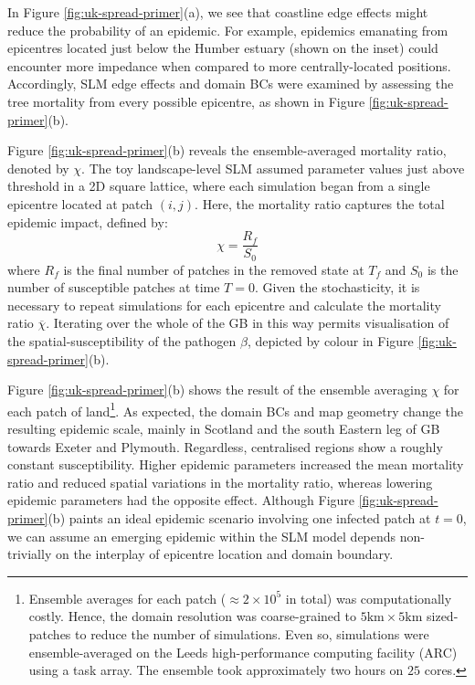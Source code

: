 In Figure \ref{fig:uk-spread-primer}(a), we see that coastline edge effects
might reduce the probability of an epidemic.
For example, epidemics emanating from epicentres located just below the 
Humber estuary (shown on the inset) could encounter more impedance when 
compared to more centrally-located positions.
Accordingly, SLM edge effects and domain BCs were examined by assessing the 
tree mortality from every possible epicentre, as shown in Figure \ref{fig:uk-spread-primer}(b).

Figure \ref{fig:uk-spread-primer}(b) reveals the ensemble-averaged mortality 
ratio, denoted by $\chi$.
The toy landscape-level SLM assumed parameter values just above threshold in a 2D square lattice,
where each simulation began from a single epicentre located at patch $(i, j)$.
Here, the mortality ratio captures the total epidemic impact, defined by: 
\begin{equation}
\label{eq:epi_impact}
    \chi=\frac{R_f}{S_0}
\end{equation}
where $R_f$ is the final number of patches in the removed state at $T_f$ and $S_0$ is the number of susceptible 
patches at time $T=0$. Given the stochasticity, it is necessary to repeat simulations for each epicentre 
and calculate the mortality ratio $\overline{\chi}$. Iterating over the whole of the GB in this way permits visualisation of the spatial-susceptibility of the pathogen $\beta$, depicted by colour in Figure \ref{fig:uk-spread-primer}(b).

Figure \ref{fig:uk-spread-primer}(b) shows the result of the ensemble averaging $\chi$ for each
patch of land\footnote{Ensemble averages for each patch ($\approx 2 \times 10^5$ in total) was computationally costly. 
Hence, the domain resolution was coarse-grained to $\mathrm{5km \times 5km}$ sized-patches to reduce the number of simulations.
Even so, simulations were ensemble-averaged on the Leeds high-performance computing facility (ARC) using a task array.
The ensemble took approximately two hours on $25$ cores.}.
As expected, the domain BCs and map geometry change the resulting epidemic scale, 
mainly in Scotland and the south Eastern leg of GB towards Exeter and Plymouth.
Regardless, centralised regions show a roughly constant susceptibility. 
Higher epidemic parameters increased the mean mortality ratio and reduced spatial variations in the mortality ratio, whereas lowering epidemic parameters had the opposite effect.
Although Figure \ref{fig:uk-spread-primer}(b) paints an ideal epidemic scenario involving one infected patch at $t=0$,
we can assume an emerging epidemic within the SLM model depends non-trivially on the interplay of epicentre location and domain boundary.
 
